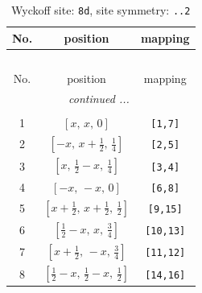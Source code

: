 \documentclass[fleqn,8pt]{jsarticle}
\begin{document}
\begin{longtable}{ccc}
\caption{Wyckoff site: {\tt 8d}, site symmetry: {\tt ..2}}
 \\
 \hline \hline
No. & position & mapping \\ \hline \endfirsthead

\multicolumn{2}{l}{\tablename\ \thetable{}} \\
 \hline \hline
No. & position & mapping \\ \hline \endhead

 \hline \hline
\multicolumn{2}{r}{\footnotesize\it continued ...} \\ \endfoot

 \hline \hline
\multicolumn{2}{r}{} \\ \endlastfoot

1 & $\left[ x,\, x,\, 0 \right]$ & {\tt [1,7]} \\ \hline
2 & $\left[ - x,\, x + \frac{1}{2},\, \frac{1}{4} \right]$ & {\tt [2,5]} \\ \hline
3 & $\left[ x,\, \frac{1}{2} - x,\, \frac{1}{4} \right]$ & {\tt [3,4]} \\ \hline
4 & $\left[ - x,\, - x,\, 0 \right]$ & {\tt [6,8]} \\ \hline
5 & $\left[ x + \frac{1}{2},\, x + \frac{1}{2},\, \frac{1}{2} \right]$ & {\tt [9,15]} \\ \hline
6 & $\left[ \frac{1}{2} - x,\, x,\, \frac{3}{4} \right]$ & {\tt [10,13]} \\ \hline
7 & $\left[ x + \frac{1}{2},\, - x,\, \frac{3}{4} \right]$ & {\tt [11,12]} \\ \hline
8 & $\left[ \frac{1}{2} - x,\, \frac{1}{2} - x,\, \frac{1}{2} \right]$ & {\tt [14,16]} \\
\end{longtable}
\renewcommand{\arraystretch}{1.2}
\end{document}
